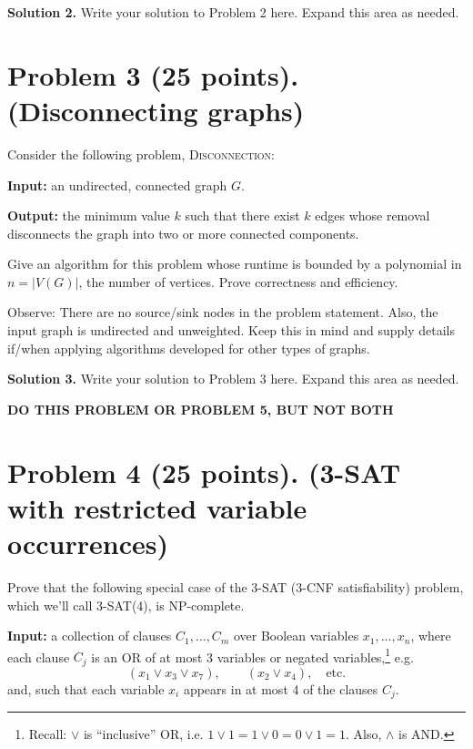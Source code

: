 \documentclass[12pt]{article}
\begin{document}
\vspace{1em}
\noindent\textbf{Solution 2.} Write your solution to Problem 2 here. Expand this area as needed.

\newpage

\section*{Problem 3 (25 points). (Disconnecting graphs)}

Consider the following problem, \textsc{Disconnection}:

\vspace{0.5em}
\noindent\textbf{Input:} an undirected, connected graph $G$.

\noindent\textbf{Output:} the minimum value $k$ such that there exist $k$ edges whose removal disconnects the graph into two or more connected components.
\vspace{0.5em}

Give an algorithm for this problem whose runtime is bounded by a polynomial in $n=|V(G)|$, the number of vertices. Prove correctness and efficiency.

Observe: There are no source/sink nodes in the problem statement. Also, the input graph is undirected and unweighted. Keep this in mind and supply details if/when applying algorithms developed for other types of graphs.

\vspace{1em}
\noindent\textbf{Solution 3.} Write your solution to Problem 3 here. Expand this area as needed.

\newpage

\begin{center}
\textbf{DO THIS PROBLEM OR PROBLEM 5, BUT NOT BOTH}
\end{center}

\section*{Problem 4 (25 points). (3-SAT with restricted variable occurrences)}

Prove that the following special case of the 3-SAT (3-CNF satisfiability) problem, which we'll call 3-SAT(4), is NP-complete.

\vspace{0.5em}
\noindent\textbf{Input:} a collection of clauses $C_1,\ldots,C_m$ over Boolean variables $x_1,\ldots,x_n$, where each clause $C_j$ is an OR of at most 3 variables or negated variables,\footnote{Recall: $\lor$ is ``inclusive'' OR, i.e. $1\lor 1=1\lor 0=0\lor 1=1$. Also, $\land$ is AND.} e.g.
\[
(x_1\lor x_3\lor x_7), \qquad (x_2\lor x_4), \quad \text{etc.}
\]
and, such that each variable $x_i$ appears in at most 4 of the clauses $C_j$.
\end{document}
